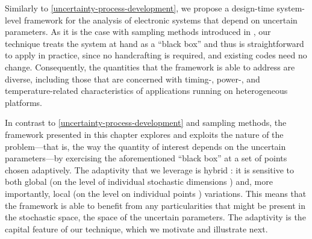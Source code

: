 Similarly to \cref{uncertainty-process-development}, we propose a design-time
system-level framework for the analysis of electronic systems that depend on
uncertain parameters. As it is the case with sampling methods introduced in
, our technique treats the system at hand as a ``black box'' and thus
is straightforward to apply in practice, since no handcrafting is required, and
existing codes need no change. Consequently, the quantities that the framework
is able to address are diverse, including those that are concerned with timing-,
power-, and temperature-related characteristics of applications running on
heterogeneous platforms.

In contrast to \cref{uncertainty-process-development} and sampling methods, the
framework presented in this chapter explores and exploits the nature of the
problem---that is, the way the quantity of interest depends on the uncertain
parameters---by exercising the aforementioned ``black box'' at a set of points
chosen adaptively. The adaptivity that we leverage is hybrid \cite{jakeman2012}:
it is sensitive to both global (on the level of individual stochastic dimensions
\cite{klimke2006}) and, more importantly, local (on the level on individual
points \cite{ma2009}) variations. This means that the framework is able to
benefit from any particularities that might be present in the stochastic space,
the space of the uncertain parameters. The adaptivity is the capital feature of
our technique, which we motivate and illustrate next.
